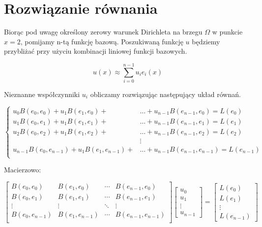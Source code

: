\documentclass{article}
\begin{document}
\cleardoublepage
\section{Rozwiązanie równania}

Biorąc pod uwagę określony zerowy warunek Dirichleta na brzegu \( \Omega \) w punkcie \( x = 2 \), pomijamy n-tą funkcję bazową. Poszukiwaną funkcję \( u \) będziemy przybliżać przy użyciu kombinacji liniowej funkcji bazowych.

\[
    u(x) \approx \sum_{i=0}^{n - 1} u_ie_i(x)
\]

Nieznanne współczynniki \( u_i \) obliczamy rozwiązując następujący układ równań.


\[
    \begin{cases}
        u_0B(e_0, e_0) + u_1B(e_1, e_0) + &\hdots + u_{n-1}B(e_{n-1}, e_0) = L(e_0) \\
        u_1B(e_0, e_1) + u_1B(e_1, e_1) + &\hdots + u_{n-1}B(e_{n-1}, e_1) = L(e_1) \\
        u_2B(e_0, e_2) + u_1B(e_1, e_2) + &\hdots + u_{n-1}B(e_{n-1}, e_2) = L(e_2) \\

        &\vdots \\
        
        u_{n-1}B(e_0, e_{n-1}) + u_1B(e_1, e_{n-1}) + &\hdots + u_{n-1}B(e_{n-1}, e_{n-1}) = L(e_{n-1}) \\
         
    \end{cases}
\]


Macierzowo:

\[
    \begin{bmatrix}
        B(e_0, e_0) & B(e_1, e_0) & \cdots & B(e_{n-1}, e_0) \\
        B(e_0, e_1) & B(e_1, e_1) & \cdots & B(e_{n-1}, e_1) \\
        \vdots & \vdots & \ddots & \vdots\\
        B(e_0, e_{n-1}) & B(e_1, e_{n-1}) & \cdots & B(e_{n-1}, e_{n-1}) \\
    \end{bmatrix}
    \begin{bmatrix}
        u_0\\u_1\\ \vdots\\u_{n-1}
    \end{bmatrix}
    =\begin{bmatrix}
        L(e_0)\\L(e_1)\\ \vdots\\L(e_{n-1})
    \end{bmatrix}
\]
\end{document}
